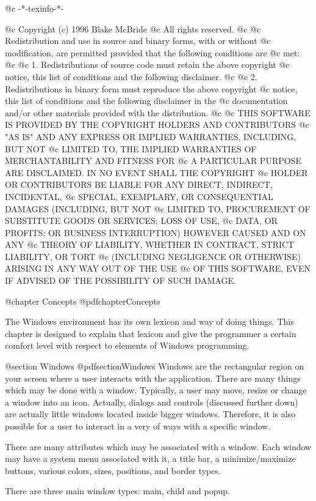 @c -*-texinfo-*-

@c  Copyright (c) 1996 Blake McBride
@c  All rights reserved.
@c
@c  Redistribution and use in source and binary forms, with or without
@c  modification, are permitted provided that the following conditions are
@c  met:
@c
@c  1. Redistributions of source code must retain the above copyright
@c  notice, this list of conditions and the following disclaimer.
@c
@c  2. Redistributions in binary form must reproduce the above copyright
@c  notice, this list of conditions and the following disclaimer in the
@c  documentation and/or other materials provided with the distribution.
@c
@c  THIS SOFTWARE IS PROVIDED BY THE COPYRIGHT HOLDERS AND CONTRIBUTORS
@c  "AS IS" AND ANY EXPRESS OR IMPLIED WARRANTIES, INCLUDING, BUT NOT
@c  LIMITED TO, THE IMPLIED WARRANTIES OF MERCHANTABILITY AND FITNESS FOR
@c  A PARTICULAR PURPOSE ARE DISCLAIMED. IN NO EVENT SHALL THE COPYRIGHT
@c  HOLDER OR CONTRIBUTORS BE LIABLE FOR ANY DIRECT, INDIRECT, INCIDENTAL,
@c  SPECIAL, EXEMPLARY, OR CONSEQUENTIAL DAMAGES (INCLUDING, BUT NOT
@c  LIMITED TO, PROCUREMENT OF SUBSTITUTE GOODS OR SERVICES; LOSS OF USE,
@c  DATA, OR PROFITS; OR BUSINESS INTERRUPTION) HOWEVER CAUSED AND ON ANY
@c  THEORY OF LIABILITY, WHETHER IN CONTRACT, STRICT LIABILITY, OR TORT
@c  (INCLUDING NEGLIGENCE OR OTHERWISE) ARISING IN ANY WAY OUT OF THE USE
@c  OF THIS SOFTWARE, EVEN IF ADVISED OF THE POSSIBILITY OF SUCH DAMAGE.


@chapter Concepts
@pdfchapter{Concepts}

The Windows environment has its own lexicon and way of doing things.
This chapter is designed to explain that lexicon and give the programmer
a certain comfort level with respect to elements of Windows programming.

@section Windows
@pdfsection{Windows}
Windows are the rectangular region on your screen where a user interacts
with the application.  There are many things which may be done with a window.
Typically, a user may move, resize or change a window into an icon.  Actually,
dialogs and controls (discussed further down) are actually little windows
located inside bigger windows.  Therefore, it is also possible for a user to
interact in a very of ways with a specific window.

There are many attributes which may be associated with a window.  Each
window may have a system menu associated with it, a title bar, a
minimize/maximize buttons, various colors, sizes, positions, and border
types.  

There are three main window types: main, child and popup.



